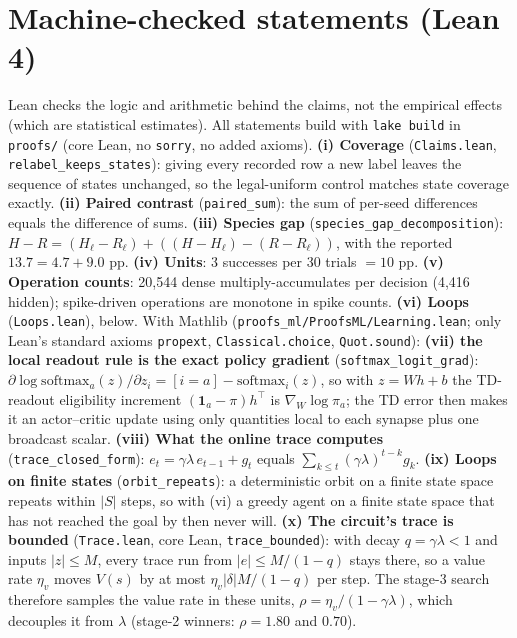 \documentclass[10pt,onecolumn,letterpaper]{article}
\begin{document}
\section{Machine-checked statements (Lean 4)}
Lean checks the logic and arithmetic behind the claims, not the empirical effects (which are statistical
estimates). All statements build with \texttt{lake build} in \texttt{proofs/} (core Lean, no \texttt{sorry}, no added
axioms). \textbf{(i) Coverage} (\texttt{Claims.lean}, \texttt{relabel\_keeps\_states}): giving every recorded row a new
label leaves the sequence of states unchanged, so the legal-uniform control matches state coverage exactly.
\textbf{(ii) Paired contrast} (\texttt{paired\_sum}): the sum of per-seed differences equals the difference of sums.
\textbf{(iii) Species gap} (\texttt{species\_gap\_decomposition}): $H-R=(H_\ell-R_\ell)+((H-H_\ell)-(R-R_\ell))$,
with the reported $13.7=4.7+9.0$ pp. \textbf{(iv) Units}: 3 successes per 30 trials $=10$ pp.
\textbf{(v) Operation counts}: 20,544 dense multiply-accumulates per decision (4,416 hidden); spike-driven operations
are monotone in spike counts. \textbf{(vi) Loops} (\texttt{Loops.lean}), below.
With Mathlib (\texttt{proofs\_ml/ProofsML/Learning.lean}; only Lean's standard axioms \texttt{propext},
\texttt{Classical.choice}, \texttt{Quot.sound}): \textbf{(vii) the local readout rule is the exact policy gradient}
(\texttt{softmax\_logit\_grad}): $\partial\log\mathrm{softmax}_a(z)/\partial z_i=[i=a]-\mathrm{softmax}_i(z)$, so with
$z=Wh+b$ the TD-readout eligibility increment $(\mathbf{1}_a-\pi)h^\top$ is $\nabla_W\log\pi_a$; the TD error then
makes it an actor--critic update using only quantities local to each synapse plus one broadcast scalar.
\textbf{(viii) What the online trace computes} (\texttt{trace\_closed\_form}): $e_t=\gamma\lambda\,e_{t-1}+g_t$ equals
$\sum_{k\le t}(\gamma\lambda)^{t-k}g_k$. \textbf{(ix) Loops on finite states} (\texttt{orbit\_repeats}): a
deterministic orbit on a finite state space repeats within $|S|$ steps, so with (vi) a greedy agent on a finite state
space that has not reached the goal by then never will.
\textbf{(x) The circuit's trace is bounded} (\texttt{Trace.lean}, core Lean, \texttt{trace\_bounded}): with decay
$q=\gamma\lambda<1$ and inputs $|z|\le M$, every trace run from $|e|\le M/(1-q)$ stays there, so a value rate $\eta_v$
moves $V(s)$ by at most $\eta_v|\delta|M/(1-q)$ per step. The stage-3 search therefore samples the value rate in these
units, $\rho=\eta_v/(1-\gamma\lambda)$, which decouples it from $\lambda$ (stage-2 winners: $\rho=1.80$ and $0.70$).
\end{document}
